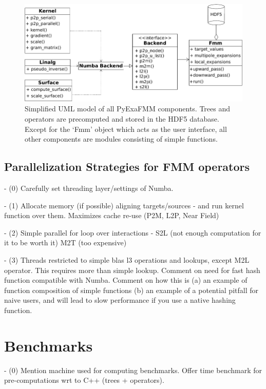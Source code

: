 \documentclass{IEEEcsmag}
\begin{document}
\begin{figure}
	\centerline{\includegraphics {figures/software.pdf}}
	\caption{Simplified UML model of all PyExaFMM components. Trees and operators are precomputed and stored in the HDF5 database. Except for the `Fmm' object which acts as the user interface, all other components are modules consisting of simple functions.}
	\label{fig:design}
\end{figure}


\subsection{Parallelization Strategies for FMM operators}

- (0) Carefully set threading layer/settings of Numba.

- (1) Allocate memory (if possible) aligning targets/sources - and run kernel function over them. Maximizes cache re-use (P2M, L2P, Near Field)

- (2) Simple parallel for loop over interactions - S2L (not enough computation for it to be worth it) M2T (too expensive)

- (3) Threads restricted to simple blas l3 operations and lookups, except M2L operator. This requires more than simple lookup. Comment on need for fast hash function compatible with Numba. Comment on how this is (a) an example of function composition of simple functions (b) an example of a potential pitfall for naive users, and will lead to slow performance if you use a native hashing function.

\section{Benchmarks}

- (0) Mention machine used for computing benchmarks. Offer time benchmark for pre-computations wrt to C++ (trees + operators).
\end{document}
